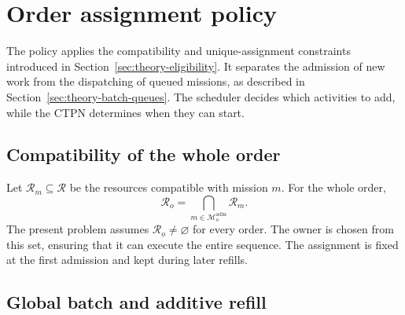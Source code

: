 \section{Order assignment policy}
\label{sec:progetto-assegnazione}

The policy applies the compatibility and unique-assignment constraints introduced
in Section~\ref{sec:theory-eligibility}. It separates the admission of new work
from the dispatching of queued missions, as described in
Section~\ref{sec:theory-batch-queues}. The scheduler decides which activities to
add, while the CTPN determines when they can start.

\subsection{Compatibility of the whole order}

Let $\mathcal R_m\subseteq\mathcal R$ be the resources compatible with mission
$m$. For the whole order,
\begin{equation}
    \mathcal R_o=\bigcap_{m\in\mathcal M_o^{\mathrm{adm}}}\mathcal R_m.
\end{equation}
The present problem assumes $\mathcal R_o\neq\varnothing$ for every order.
The owner is chosen from this set, ensuring that it can execute the entire
sequence. The assignment is fixed at the first admission and kept during later
refills.

\subsection{Global batch and additive refill}

